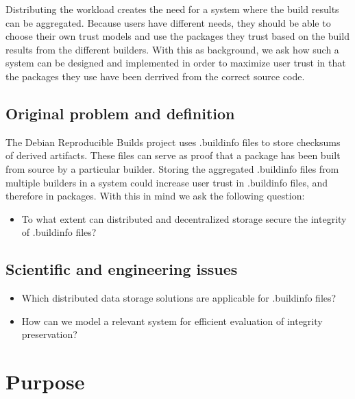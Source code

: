 \documentclass[english, biblatex, digitaloutput]{kththesis}
\begin{document}
Distributing the workload creates the need for a system where the build results can be aggregated. Because users have different needs, they should be able to choose their own trust models and use the packages they trust based on the build results from the different builders. With this as background, we ask how such a system can be designed and implemented in order to maximize user trust in that the packages they use have been derrived from the correct source code.

\subsection{Original problem and definition}
\label{sec:researchQuestion}

The Debian Reproducible Builds project uses .buildinfo files to store checksums of derived artifacts. These files can serve as proof that a package has been built from source by a particular builder. Storing the aggregated .buildinfo files from multiple builders in a system could increase user trust in .buildinfo files, and therefore in packages. With this in mind we ask the following question:

\begin{itemize}
	\item To what extent can distributed and decentralized storage secure the integrity of .buildinfo files?
\end{itemize}

\subsection{Scientific and engineering issues}
\begin{itemize}
	\item Which distributed data storage solutions are applicable for .buildinfo files?
	\item How can we model a relevant system for efficient evaluation of integrity preservation?
\end{itemize}

\section{Purpose}
\end{document}
